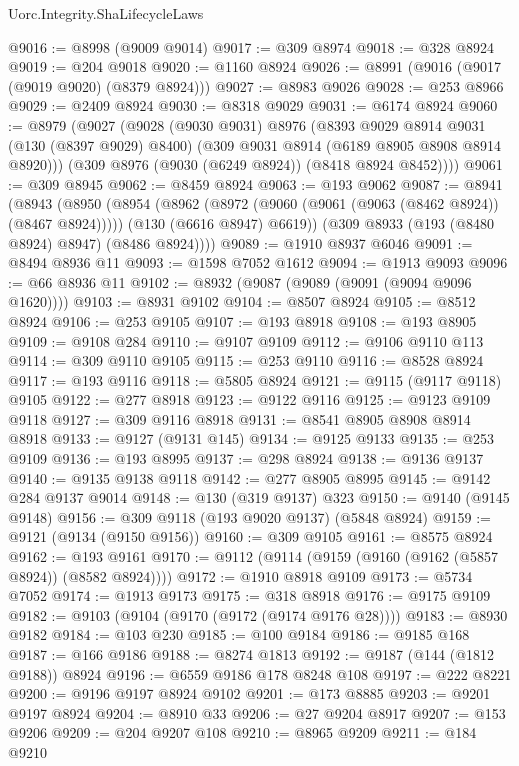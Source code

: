 \begin{lexlean}{Uorc.Integrity.ShaLifecycleLaws}
\begin{coremodule}
@9016 := @8998 (@9009 @9014)
@9017 := @309 @8974
@9018 := @328 @8924
@9019 := @204 @9018
@9020 := @1160 @8924
@9026 := @8991 (@9016 (@9017 (@9019 @9020) (@8379 @8924)))
@9027 := @8983 @9026
@9028 := @253 @8966
@9029 := @2409 @8924
@9030 := @8318 @9029
@9031 := @6174 @8924
@9060 := @8979
    (@9027
      (@9028
        (@9030 @9031)
        @8976
        (@8393
          @9029
          @8914
          @9031
          (@130 (@8397 @9029) @8400)
          (@309 @9031 @8914 (@6189 @8905 @8908 @8914 @8920)))
        (@309 @8976 (@9030 (@6249 @8924)) (@8418 @8924 @8452))))
@9061 := @309 @8945
@9062 := @8459 @8924
@9063 := @193 @9062
@9087 := @8941
    (@8943
      (@8950
        (@8954
          (@8962 (@8972 (@9060 (@9061 (@9063 (@8462 @8924)) (@8467 @8924)))))
          (@130 (@6616 @8947) @6619))
        (@309 @8933 (@193 (@8480 @8924) @8947) (@8486 @8924))))
@9089 := @1910 @8937 @6046
@9091 := @8494 @8936 @11
@9093 := @1598 @7052 @1612
@9094 := @1913 @9093
@9096 := @66 @8936 @11
@9102 := @8932 (@9087 (@9089 (@9091 (@9094 @9096 @1620))))
@9103 := @8931 @9102
@9104 := @8507 @8924
@9105 := @8512 @8924
@9106 := @253 @9105
@9107 := @193 @8918
@9108 := @193 @8905
@9109 := @9108 @284
@9110 := @9107 @9109
@9112 := @9106 @9110 @113
@9114 := @309 @9110 @9105
@9115 := @253 @9110
@9116 := @8528 @8924
@9117 := @193 @9116
@9118 := @5805 @8924
@9121 := @9115 (@9117 @9118) @9105
@9122 := @277 @8918
@9123 := @9122 @9116
@9125 := @9123 @9109 @9118
@9127 := @309 @9116 @8918
@9131 := @8541 @8905 @8908 @8914 @8918
@9133 := @9127 (@9131 @145)
@9134 := @9125 @9133
@9135 := @253 @9109
@9136 := @193 @8995
@9137 := @298 @8924
@9138 := @9136 @9137
@9140 := @9135 @9138 @9118
@9142 := @277 @8905 @8995
@9145 := @9142 @284 @9137 @9014
@9148 := @130 (@319 @9137) @323
@9150 := @9140 (@9145 @9148)
@9156 := @309 @9118 (@193 @9020 @9137) (@5848 @8924)
@9159 := @9121 (@9134 (@9150 @9156))
@9160 := @309 @9105
@9161 := @8575 @8924
@9162 := @193 @9161
@9170 := @9112 (@9114 (@9159 (@9160 (@9162 (@5857 @8924)) (@8582 @8924))))
@9172 := @1910 @8918 @9109
@9173 := @5734 @7052
@9174 := @1913 @9173
@9175 := @318 @8918
@9176 := @9175 @9109
@9182 := @9103 (@9104 (@9170 (@9172 (@9174 @9176 @28))))
@9183 := @8930 @9182
@9184 := @103 @230
@9185 := @100 @9184
@9186 := @9185 @168
@9187 := @166 @9186
@9188 := @8274 @1813
@9192 := @9187 (@144 (@1812 @9188)) @8924
@9196 := @6559 @9186 @178 @8248 @108
@9197 := @222 @8221
@9200 := @9196 @9197 @8924 @9102
@9201 := @173 @8885
@9203 := @9201 @9197 @8924
@9204 := @8910 @33
@9206 := @27 @9204 @8917
@9207 := @153 @9206
@9209 := @204 @9207 @108
@9210 := @8965 @9209
@9211 := @184 @9210

\end{coremodule}
\end{lexlean}
